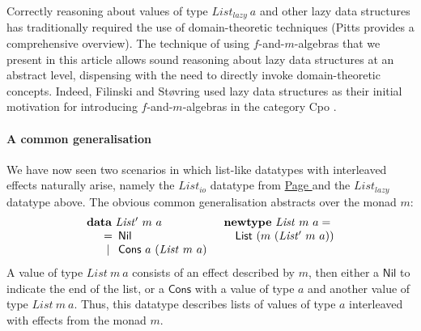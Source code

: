 \documentclass{jfp1}
\newcommand{\kw}[1]{\textbf{#1}}
\begin{document}
Correctly reasoning about values of type $\mathit{List_{lazy}}~a$ and
other lazy data structures has traditionally required the use of
domain-theoretic techniques (Pitts \cite{pitts96relational} provides a
comprehensive overview). The technique of using $f$-and-$m$-algebras
that we present in this article allows sound reasoning about lazy data
structures at an abstract level, dispensing with the need to directly
invoke domain-theoretic concepts. Indeed, Filinski and St\o{}vring
used lazy data structures as their initial motivation for introducing
$f$-and-$m$-algebras in the category Cpo \cite{filinski07inductive}.

\paragraph{A common generalisation} We have now seen two scenarios in
which list-like datatypes with interleaved effects naturally arise,
namely the $\mathit{List_{io}}$ datatype from
\hyperref[defn:listio]{Page \pageref*{defn:listio}} and the
$\mathit{List_{lazy}}$ datatype above. The obvious common
generalisation abstracts over the monad $m$:
\begin{displaymath}
  \begin{array}{ll}
    \kw{data}~\mathit{List'}~m~a
    &
    \kw{newtype}~\mathit{List}~m~a = 
    \\
    \quad
    \begin{array}[t]{c@{\hspace{0.5em}}l}
      = & \mathsf{Nil} \\
      | & \mathsf{Cons}~a~(\mathit{List}~m~a) \\
    \end{array}
    &
    \quad \mathsf{List}~(m~(\mathit{List'}~m~a))
  \end{array}
\end{displaymath}
A value of type $\mathit{List}~m~a$ consists of an effect described by
$m$, then either a $\mathsf{Nil}$ to indicate the end of the list,
or a $\mathsf{Cons}$ with a value of type $a$ and another value of
type $\mathit{List}~m~a$. Thus, this datatype describes lists of values
of type $a$ interleaved with effects from the monad $m$.
\end{document}
